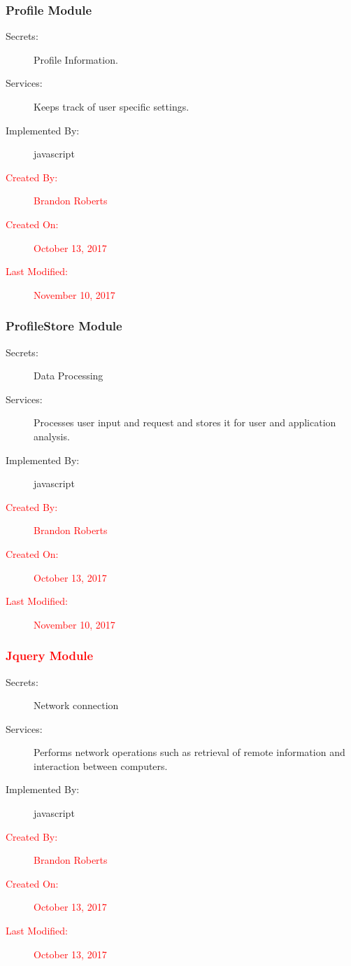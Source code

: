 \documentclass[12pt, titlepage]{article}
\begin{document}
\subsubsection{Profile Module}\label{m3}
\begin{description}
\item[Secrets:] Profile Information.
\item[Services:] Keeps track of user specific settings.
\item[Implemented By:] javascript
\item[\textcolor{red}{Created By:}] \textcolor{red}{Brandon Roberts}
\item[\textcolor{red}{Created On:}] \textcolor{red}{October 13, 2017}
\item[\textcolor{red}{Last Modified:}] \textcolor{red}{November 10, 2017}
\end{description}

\subsubsection{ProfileStore Module}\label{m4}
\begin{description}
\item[Secrets:] Data Processing
\item[Services:] Processes user input and request 	 and stores it for user and application analysis.
\item[Implemented By:] javascript
\item[\textcolor{red}{Created By:}] \textcolor{red}{Brandon Roberts}
\item[\textcolor{red}{Created On:}] \textcolor{red}{October 13, 2017}
\item[\textcolor{red}{Last Modified:}] \textcolor{red}{November 10, 2017}
\end{description}

\subsubsection{\textcolor{red}{Jquery Module}}\label{m5}
\begin{description}
\item[Secrets:] Network connection
\item[Services:] Performs network operations such as retrieval of remote information and interaction between computers.
\item[Implemented By:] javascript
\item[\textcolor{red}{Created By:}] \textcolor{red}{Brandon Roberts}
\item[\textcolor{red}{Created On:}] \textcolor{red}{October 13, 2017}
\item[\textcolor{red}{Last Modified:}] \textcolor{red}{October 13, 2017}
\end{description}
\end{document}

